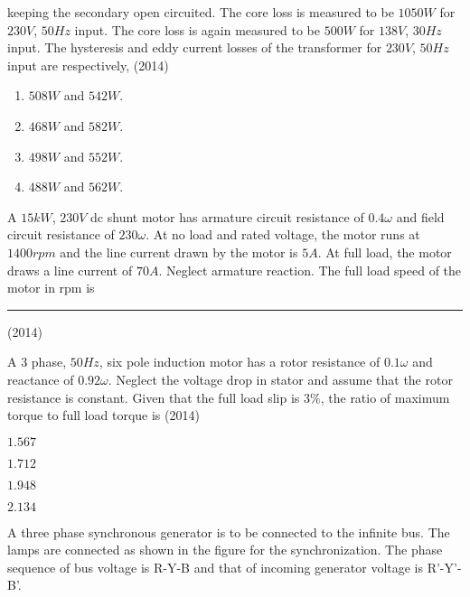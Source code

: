 keeping the secondary open circuited. The core loss is measured to be $1050 W$ for $230 V$, $50 Hz$
input. The core loss is again measured to be $500 W$ for $138 V$, $30 Hz$ input. The hysteresis and eddy
current losses of the transformer for $230 V$, $50 Hz$ input are respectively,
\hfill{(2014)}
		\begin{enumerate}
		       \item $508 W$ and $542 W$. 
		       \item $468 W$ and $582 W$.
		       \item $498 W$ and $552 W$. 
		       \item $488 W$ and $562 W$.
        	\end{enumerate}	
	\item A $15 kW$, $230 V$ dc shunt motor has armature circuit resistance of $0.4 \omega$ and field circuit resistance
of $230 \omega$. At no load and rated voltage, the motor runs at $1400 rpm$ and the line current drawn by
the motor is $5 A$. At full load, the motor draws a line current of $70 A$. Neglect armature reaction.
The full load speed of the motor in rpm is \rule{1cm}{0.15mm}
\hfill{(2014)}
    
	\item  A $3$ phase, $50 Hz$, six pole induction motor has a rotor resistance of $0.1 \omega$ and reactance of $0.92\omega$.
Neglect the voltage drop in stator and assume that the rotor resistance is constant. Given that the
full load slip is $3\%$, the ratio of maximum torque to full load torque is 
\hfill{(2014)}
		\begin{enumerate}
            \begin{multicols}{4}
			\item $1.567$
			\item $ 1.712$
			\item $ 1.948$
			\item $ 2.134$
   \end{multicols}
        	\end{enumerate}	
	\item A three phase synchronous generator is to be connected to the infinite bus. The lamps are connected
as shown in the figure for the synchronization. The phase sequence of bus voltage is R-Y-B and
that of incoming generator voltage is R'-Y'-B'.



